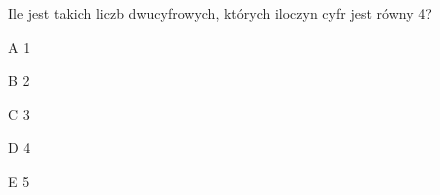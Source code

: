\begin{tresc}
Ile jest takich liczb dwucyfrowych, których iloczyn cyfr jest równy 4?
\end{tresc}
\begin{wariant}{A} 1 \end{wariant}
\begin{wariant}{B} 2 \end{wariant}
\begin{wariant}{C} 3 \end{wariant}
\begin{wariant}{D} 4 \end{wariant}
\begin{wariant}{E} 5 \end{wariant}
